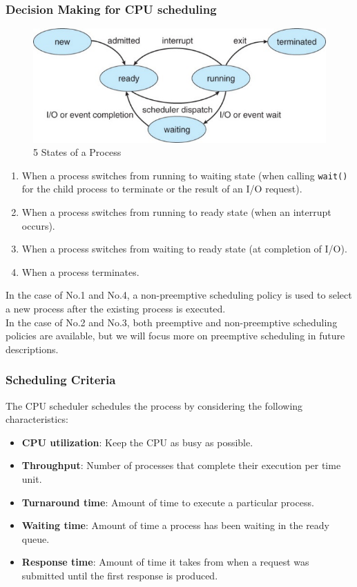 \documentclass{homework}
\begin{document}
\subsubsection{Decision Making for CPU scheduling}
\begin{figure}[h]
\begin{center}
\includegraphics[scale=1.5]{1.png}    
\caption{5 States of a Process}
\end{center}
\end{figure}

\begin{enumerate}
    \item When a process switches from running to waiting state (when calling \texttt{wait()} for the child process to terminate or the result of an I/O request).
    \item When a process switches from running to ready state (when an interrupt occurs).
    \item When a process switches from waiting to ready state (at completion of I/O).
    \item When a process terminates.
\end{enumerate}
In the case of No.1 and No.4, a non-preemptive scheduling policy is used to select a new process after the existing process is executed.
\\
In the case of No.2 and No.3, both preemptive and non-preemptive scheduling policies are available, but we will focus more on preemptive scheduling in future descriptions.
\subsubsection{Scheduling Criteria}
The CPU scheduler schedules the process by considering the following characteristics:
\begin{itemize}
    \item \textbf{CPU utilization}: Keep the CPU as busy as possible.  
    \item \textbf{Throughput}: Number of processes that complete their execution per time unit.
    \item \textbf{Turnaround time}: Amount of time to execute a particular process.
    \item \textbf{Waiting time}: Amount of time a process has been waiting in the ready queue.
    \item \textbf{Response time}: Amount of time it takes from when a request was submitted until the first response is produced.
\end{itemize}
\end{document}
